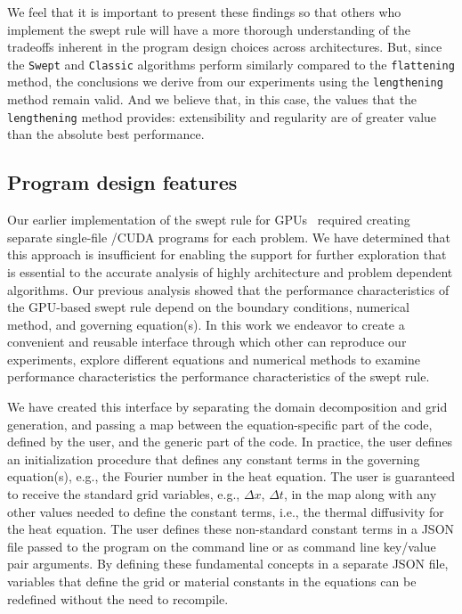We feel that it is important to present these findings so that others who implement the swept rule will have a more thorough understanding of the tradeoffs inherent in the program design choices across architectures.
But, since the \texttt{Swept} and \texttt{Classic} algorithms perform similarly compared to the \texttt{flattening} method, the conclusions we derive from our experiments using the \texttt{lengthening} method remain valid.
And we believe that, in this case, the values that the \texttt{lengthening} method provides: extensibility and regularity are of greater value than the absolute best performance.

\subsection{Program design features}

Our earlier implementation of the swept rule for GPUs~\cite{OurJCP} required creating separate single-file
\CC{}\slash CUDA programs for each problem.
We have determined that this approach is insufficient for enabling the support for further exploration that is essential to the accurate analysis of highly architecture
and problem dependent algorithms.
Our previous analysis showed that the performance characteristics of the GPU-based swept rule depend
on the boundary conditions, numerical method, and governing equation(s).
In this work we endeavor to create a convenient and reusable interface through which other can reproduce our experiments, explore different equations and numerical methods to examine performance characteristics the performance characteristics of the swept rule.

We have created this interface by separating the domain decomposition and grid generation, and passing
a map between the equation-specific part of the code, defined by the user, and the generic part of the code.
In practice, the user defines an initialization procedure that defines any constant terms in the
governing equation(s), e.g., the Fourier number in the heat equation.
The user is guaranteed to receive the standard grid variables, e.g., $\Delta x$, $\Delta t$, in the map
along with any other values needed to define the constant terms, i.e., the thermal diffusivity
for the heat equation.
The user defines these non-standard constant terms in a JSON file passed to the program on the command line
or as command line key/value pair arguments. By defining these fundamental concepts in a separate JSON
file, variables that define the grid or material constants in the equations can be redefined without
the need to recompile.

